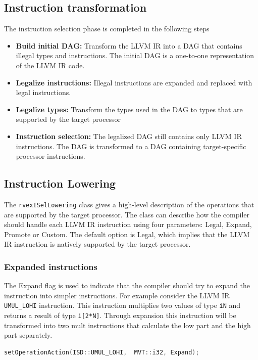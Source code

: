\subsection{Instruction transformation}
The instruction selection phase is completed in the following steps
\begin{itemize}
  \item \textbf{Build initial DAG:} Transform the LLVM IR into a DAG that contains illegal types and instructions. The initial DAG is a one-to-one representation of the LLVM IR code.
  \item \textbf{Legalize instructions:} Illegal instructions are expanded and replaced with legal instructions.
  \item \textbf{Legalize types:} Transform the types used in the DAG to types that are supported by the target processor 
  \item \textbf{Instruction selection:} The legalized DAG still contains only LLVM IR instructions. The DAG is transformed to a DAG containing target-specific processor instructions.
\end{itemize}

\subsection{Instruction Lowering}
The \texttt{rvexISelLowering} class gives a high-level description of the operations that are supported by the target processor. The class can describe how the compiler should handle each LLVM IR instruction using four parameters: Legal, Expand, Promote or Custom. The default option is Legal, which implies that the LLVM IR instruction is natively supported by the target processor.

\subsubsection{Expanded instructions}
The Expand flag is used to indicate that the compiler should try to expand the instruction into simpler instructions. 
For example consider the LLVM IR \texttt{UMUL\_LOHI} instruction. This instruction multiplies two values of type \texttt{iN} and returns a result of type \texttt{i[2*N]}. Through expansion this instruction will be transformed into two mult instructions that calculate the low part and the high part separately.

\begin{lstlisting}[language=c] 
setOperationAction(ISD::UMUL_LOHI,  MVT::i32, Expand);
\end{lstlisting}

